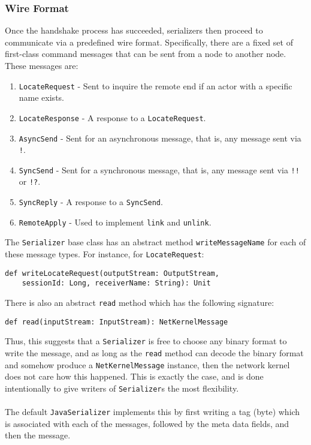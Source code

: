 \documentclass{article}
\begin{document}
\subsubsection{Wire Format}
Once the handshake process has succeeded, serializers then proceed to communicate
via a predefined wire format. Specifically, there are a fixed set of first-class
command messages that can be sent from a node to another node. These messages are:
\begin{enumerate}
  \item \verb|LocateRequest| - Sent to inquire the remote end if an actor with a specific
    name exists.
  \item \verb|LocateResponse| - A response to a \verb|LocateRequest|.
  \item \verb|AsyncSend| - Sent for an asynchronous message, that is, any message
    sent via \verb|!|.
  \item \verb|SyncSend| - Sent for a synchronous message, that is, any message sent
    via \verb|!!| or \verb|!?|.
  \item \verb|SyncReply| - A response to a \verb|SyncSend|.
  \item \verb|RemoteApply| - Used to implement \verb|link| and \verb|unlink|.
\end{enumerate}
The \verb|Serializer| base class has an abstract method \verb|writeMessageName| for each 
of these message types. For instance, for \verb|LocateRequest|:
\begin{verbatim}
def writeLocateRequest(outputStream: OutputStream, 
    sessionId: Long, receiverName: String): Unit
\end{verbatim}
There is also an abstract \verb|read| method which has the following signature:
\begin{verbatim}
def read(inputStream: InputStream): NetKernelMessage
\end{verbatim}
Thus, this suggests that a \verb|Serializer| is free to choose any binary format to write the message,
and as long as the \verb|read| method can decode the binary format and somehow produce a 
\verb|NetKernelMessage| instance, then the network kernel does not care how this happened.
This is exactly the case, and is done intentionally to give writers of \verb|Serializer|s the most
flexibility.\\ \\
The default \verb|JavaSerializer| implements this by first writing a tag (byte) which is associated
with each of the messages, followed by the meta data fields, and then the message.
\end{document}
